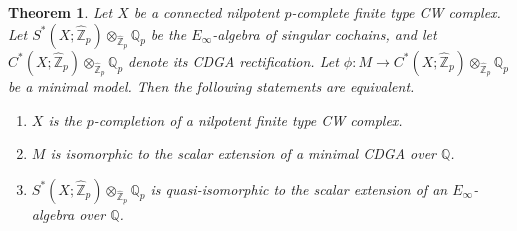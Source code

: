 \documentclass[11pt]{amsart}
\newtheorem{theorem}{Theorem}[section]
\theoremstyle{definition}
\numberwithin{equation}{section}
\numberwithin{equation}{section}
\newcommand\QQ{\mathbb{Q}}
\newcommand\ZZ{\mathbb{Z}}
\begin{document}
\begin{theorem}\label{Cor: minimal model lifting is space lifting}
Let $X$ be a connected nilpotent $p$-complete finite type CW complex. Let $S^*(X;\widehat{\ZZ}_p)\otimes_{\widehat{\ZZ}_p} \QQ_p$ be the $E_{\infty}$-algebra of singular cochains, and let $C^*(X;\widehat{\ZZ}_p)\otimes_{\widehat{\ZZ}_p} \QQ_p$ denote its CDGA rectification. Let $\phi:M\rightarrow C^*(X;\widehat{\ZZ}_p)\otimes_{\widehat{\ZZ}_p} \QQ_p$ be a minimal model. Then the following statements are equivalent.
\begin{enumerate}[leftmargin=0.25in]
    \item $X$ is the $p$-completion of a nilpotent finite type CW complex.
    \item $M$ is isomorphic to the scalar extension of a minimal CDGA over $\QQ$.
    \item $S^*(X;\widehat{\ZZ}_p)\otimes_{\widehat{\ZZ}_p} \QQ_p$ is quasi-isomorphic to the scalar extension of an $E_{\infty}$-algebra over $\QQ$.
\end{enumerate}
\end{theorem}
\end{document}
